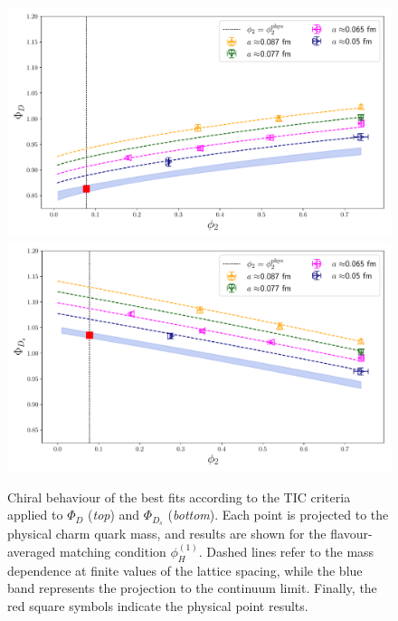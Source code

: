 \begin{figure}
	\centering
	\includegraphics[scale=0.50]{./cap6/figs/fds/fit_fD_fl_ave.pdf}
	\includegraphics[scale=0.50]{./cap6/figs/fds/fit_fDs_fl_ave.pdf}
	\caption{Chiral behaviour of the best fits according to the TIC criteria applied to  $\Phi_D$ (\textit{top}) and $\Phi_{D_s}$ (\textit{bottom}). Each point is projected to the physical charm quark mass, and results are shown for the flavour-averaged matching condition $\phi_H^{(1)}$. Dashed lines refer to the mass dependence at finite  values of the lattice spacing, while the blue band represents the projection to the continuum limit. Finally, the red square symbols indicate the physical point results.}
	\label{fig:chiral_fits_fds}
\end{figure}

